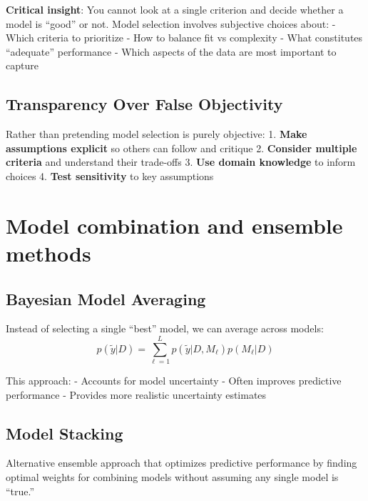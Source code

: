 \documentclass[
  letterpaper,
  DIV=11,
  numbers=noendperiod]{scrreprt}
\begin{document}
\textbf{Critical insight}: You cannot look at a single criterion and
decide whether a model is ``good'' or not. Model selection involves
subjective choices about: - Which criteria to prioritize - How to
balance fit vs complexity - What constitutes ``adequate'' performance -
Which aspects of the data are most important to capture

\subsection{Transparency Over False
Objectivity}\label{transparency-over-false-objectivity}

Rather than pretending model selection is purely objective: 1.
\textbf{Make assumptions explicit} so others can follow and critique 2.
\textbf{Consider multiple criteria} and understand their trade-offs 3.
\textbf{Use domain knowledge} to inform choices 4. \textbf{Test
sensitivity} to key assumptions

\section{Model combination and ensemble
methods}\label{model-combination-and-ensemble-methods}

\subsection{Bayesian Model Averaging}\label{bayesian-model-averaging}

Instead of selecting a single ``best'' model, we can average across
models: \[
p(\tilde{y} | D) = \sum_{\ell=1}^L p(\tilde{y} | D, M_\ell) p(M_\ell | D)
\]

This approach: - Accounts for model uncertainty - Often improves
predictive performance - Provides more realistic uncertainty estimates

\subsection{Model Stacking}\label{model-stacking}

Alternative ensemble approach that optimizes predictive performance by
finding optimal weights for combining models without assuming any single
model is ``true.''
\end{document}
